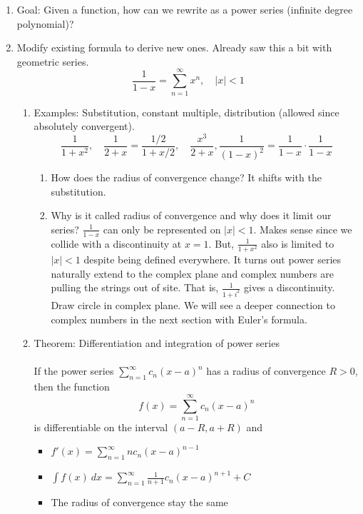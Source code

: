 \documentclass{article}
\newcommand{\ds}{\displaystyle}
\begin{document}
\begin{enumerate}
\item Goal: Given a function, how can we rewrite as a power series (infinite degree polynomial)?

\item Modify existing formula to derive new ones. Already saw this a bit with geometric series.
\[
\frac{1}{1-x} = \sum_{n=1}^\infty x^n,\quad |x|<1
\]
\begin{enumerate}

\item Examples: Substitution, constant multiple, distribution (allowed since absolutely convergent).
$$
\frac{1}{1+x^2}, \quad\frac{1}{2+x} = \frac{1/2}{1+x/2}, \quad\frac{x^3}{2+x}, \frac{1}{(1-x)^2} = \frac{1}{1-x}\cdot\frac{1}{1-x}
$$
\begin{enumerate}
\item How does the radius of convergence change? It shifts with the substitution.
\item Why is it called radius of convergence and why does it limit our series? $\frac{1}{1-x}$ can only be represented on $|x|<1$. Makes sense since we collide with a discontinuity at $x=1$. But, $\frac{1}{1+x^2}$ also is limited to $|x|<1$ despite being defined everywhere. It turns out power series naturally extend to the complex plane and complex numbers are pulling the strings out of site. That is, $\frac{1}{1+i^2}$ gives a discontinuity. Draw circle in complex plane. We will see a deeper connection to complex numbers in the next section with Euler's formula. 
\end{enumerate}

\item Theorem: Differentiation and integration of power series \\ \ \\
If the power series $\ds \sum_{n=1}^\infty c_n(x-a)^n$ has a radius of convergence $R>0$, then the function 
$$
f(x) = \sum_{n=1}^\infty c_n(x-a)^n
$$
is differentiable on the interval $(a-R,a+R)$ and
\begin{itemize}
\item $\ds f'(x) =  \sum_{n=1}^\infty nc_n(x-a)^{n-1}$
\item $\ds \int f(x)~dx=  \sum_{n=1}^\infty \frac{1}{n+1}c_n(x-a)^{n+1}+C$
\item The radius of convergence stay the same
\end{itemize}


\end{enumerate}
\end{enumerate}
\end{document}
